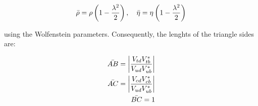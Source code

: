 \begin{equation}
    \Bar{\rho} = \rho\left(1 - \frac{\lambda^2}{2}\right), \quad \Bar{\eta} = \eta\left(1 - \frac{\lambda^2}{2}\right)
\end{equation}

using the Wolfenstein parameters.
Consequently, the lenghts of the triangle sides are:

\begin{align}
    \Bar{AB} = \abs{\frac{V_{td}V_{tb}^*}{V_{ud}V_{ub}^*}} \\
    \Bar{AC} = \abs{\frac{V_{cd}V_{cb}^*}{V_{ud}V_{ub}^*}} \\
    \Bar{BC} = 1
\end{align}

